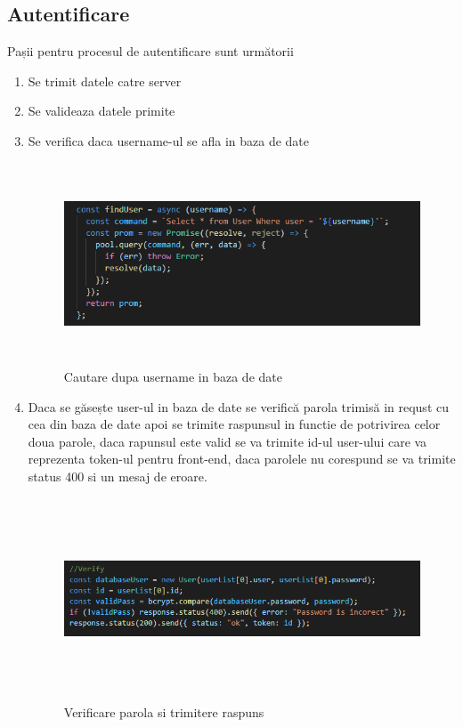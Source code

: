 \subsection{Autentificare}
\par Pașii pentru procesul de autentificare sunt următorii
\begin{enumerate}
  	\item Se trimit datele catre server
  	\item Se valideaza datele primite
  	\item Se verifica daca username-ul se afla in baza de date 
		\begin{figure}[htbp]
			\centerline{\includegraphics[width=19cm, height=6cm]{figures/cautare user.png}}
			\caption{Cautare dupa username in baza de date}
			\label{fig}
		\end{figure}	
	\item Daca se găsește user-ul in baza de date se verifică parola trimisă in requst cu cea din baza de date apoi se trimite raspunsul in functie de potrivirea celor doua parole, daca rapunsul este valid se va trimite id-ul user-ului care va reprezenta token-ul pentru front-end, daca  parolele nu corespund se va trimite status 400 si un mesaj de eroare.
		\begin{figure}[htbp]
			\centerline{\includegraphics[width=19cm, height=6cm]{figures/verificare login.png}}
			\caption{Verificare parola si trimitere raspuns}
			\label{fig}
		\end{figure}	
\end{enumerate}


